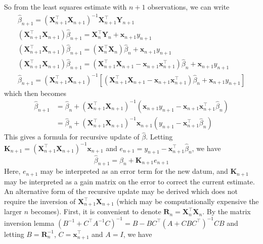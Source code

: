 \documentclass[11pt]{report} %
\begin{document}
So from the least squares estimate with $n + 1$ observations, we can write
\begin{gather}
\hat{\beta}_{n + 1} = \left(\mathbf{X}_{n + 1}^{\top}\mathbf{X}_{n + 1}\right)^{-1}\mathbf{X}_{n + 1}^{\top}\mathbf{Y}_{n + 1} \\
\left(\mathbf{X}_{n + 1}^{\top}\mathbf{X}_{n + 1}\right)\hat{\beta}_{n + 1} = \mathbf{X}_{n}^{\top}\mathbf{Y}_{n} + \mathbf{x}_{n + 1}y_{n + 1} \\
\left(\mathbf{X}_{n + 1}^{\top}\mathbf{X}_{n + 1}\right)\hat{\beta}_{n + 1} = \left(\mathbf{X}_{n}^{\top}\mathbf{X}_{n}\right)\hat{\beta}_{n} + \mathbf{x}_{n + 1}y_{n + 1} \\
\left(\mathbf{X}_{n + 1}^{\top}\mathbf{X}_{n + 1}\right)\hat{\beta}_{n + 1} = \left(\mathbf{X}_{n+1}^{\top}\mathbf{X}_{n+1} - \mathbf{x}_{n + 1}\mathbf{x}_{n + 1}^{\top}\right)\hat{\beta}_{n} + \mathbf{x}_{n + 1}y_{n + 1} \\
\hat{\beta}_{n + 1} = \left(\mathbf{X}_{n + 1}^{\top}\mathbf{X}_{n + 1}\right)^{-1}\left[\left(\mathbf{X}_{n+1}^{\top}\mathbf{X}_{n+1} - \mathbf{x}_{n + 1}\mathbf{x}_{n + 1}^{\top}\right)\hat{\beta}_{n} + \mathbf{x}_{n + 1}y_{n + 1}\right]
\end{gather}
which then becomes
\begin{align}
\hat{\beta}_{n + 1} &= \hat{\beta}_{n} + \left(\mathbf{X}_{n + 1}^{\top}\mathbf{X}_{n + 1}\right)^{-1}\left(\mathbf{x}_{n + 1}y_{n + 1} - \mathbf{x}_{n + 1}\mathbf{x}_{n + 1}^{\top}\hat{\beta}_{n}\right) \\
&= \hat{\beta}_{n} + \left(\mathbf{X}_{n + 1}^{\top}\mathbf{X}_{n + 1}\right)^{-1}\mathbf{x}_{n + 1}\left(y_{n + 1} - \mathbf{x}_{n + 1}^{\top}\hat{\beta}_{n}\right)
\end{align}
This gives a formula for recursive update of $\hat{\beta}$. Letting $\mathbf{K}_{n + 1} = \left(\mathbf{X}_{n + 1}^{\top}\mathbf{X}_{n + 1}\right)^{-1}\mathbf{x}_{n + 1}$ and $e_{n + 1} = y_{n + 1} - \mathbf{x}_{n + 1}^{\top}\hat{\beta}_{n}$, we have
\begin{equation}
\hat{\beta}_{n + 1} = \hat{\beta}_{n} + \mathbf{K}_{n + 1}e_{n + 1}
\end{equation}
Here, $e_{n + 1}$ may be interpreted as an error term for the new datum, and $ \mathbf{K}_{n + 1}$ may be interpreted as a gain matrix on the error to correct the current estimate. An alternative form of the recursive update may be derived which does not require the inversion of $\mathbf{X}_{n + 1}^{\top}\mathbf{X}_{n + 1}$ (which may be computationally expensive the larger $n$ becomes). First, it is convenient to denote $\mathbf{R}_{n} = \mathbf{X}_{n}^{\top}\mathbf{X}_{n}$. By the matrix inversion lemma $\left(B^{-1} + C^{\top}A^{-1}C\right)^{-1} = B - BC^{\top}\left(A+CBC^{\top}\right)^{-1}CB$ and letting $B = \mathbf{R}_{n}^{-1}$, $C = \mathbf{x}_{n + 1}^{\top}$ and $A = I$, we have
\end{document}
